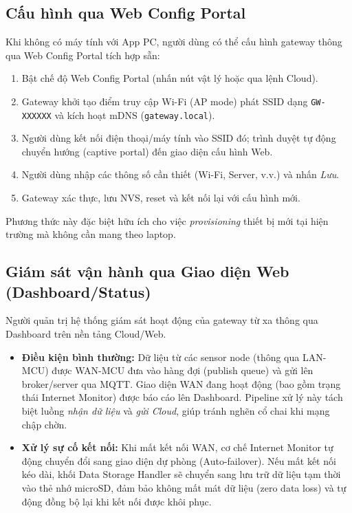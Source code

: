     \subsection{Cấu hình qua Web Config Portal}
    Khi không có máy tính với App PC, người dùng có thể cấu hình gateway thông qua Web Config Portal tích hợp sẵn:
    \begin{enumerate}
        \item Bật chế độ Web Config Portal (nhấn nút vật lý hoặc qua lệnh Cloud).
        \item Gateway khởi tạo điểm truy cập Wi-Fi (AP mode) phát SSID dạng \texttt{GW-XXXXXX} và kích hoạt mDNS (\texttt{gateway.local}).
        \item Người dùng kết nối điện thoại/máy tính vào SSID đó; trình duyệt tự động chuyển hướng (captive portal) đến giao diện cấu hình Web.
        \item Người dùng nhập các thông số cần thiết (Wi-Fi, Server, v.v.) và nhấn \textit{Lưu}.
        \item Gateway xác thực, lưu NVS, reset và kết nối lại với cấu hình mới.
    \end{enumerate}
    Phương thức này đặc biệt hữu ích cho việc \textit{provisioning} thiết bị mới tại hiện trường mà không cần mang theo laptop.


    \subsection{Giám sát vận hành qua Giao diện Web (Dashboard/Status)}
    Người quản trị hệ thống giám sát hoạt động của gateway từ xa thông qua Dashboard trên nền tảng Cloud/Web.

    \begin{itemize}
        \item \textbf{Điều kiện bình thường:} Dữ liệu từ các sensor node (thông qua LAN-MCU) được WAN-MCU đưa vào hàng đợi (publish queue) và gửi lên broker/server qua MQTT. Giao diện WAN đang hoạt động (bao gồm trạng thái Internet Monitor) được báo cáo lên Dashboard. Pipeline xử lý này tách biệt luồng \textit{nhận dữ liệu} và \textit{gửi Cloud}, giúp tránh nghẽn cổ chai khi mạng chập chờn.
        \item \textbf{Xử lý sự cố kết nối:} Khi mất kết nối WAN, cơ chế Internet Monitor tự động chuyển đổi sang giao diện dự phòng (Auto-failover). Nếu mất kết nối kéo dài, khối Data Storage Handler sẽ chuyển sang lưu trữ dữ liệu tạm thời vào thẻ nhớ microSD, đảm bảo không mất mát dữ liệu (zero data loss) và tự động đồng bộ lại khi kết nối được khôi phục.
    \end{itemize}

